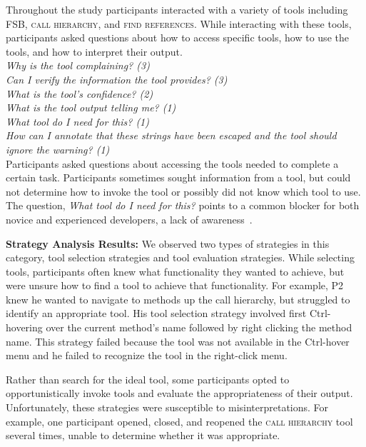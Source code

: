 \documentclass[10pt,journal,compsoc]{IEEEtran}
\begin{document}
\label{uit}

Throughout the study participants interacted with a variety of tools including FSB, \textsc{call hierarchy}, and \textsc{find references}. 
While interacting with these tools, participants asked questions about how to access specific tools, how to use the tools, and how to interpret their output. 
\\

\noindent\emph{Why is the tool complaining? (3)} \\
\emph{Can I verify the information the tool provides? (3)} \\
\emph{What is the tool's confidence? (2)} \\
\emph{What is the tool output telling me? (1)} \\
\emph{What tool do I need for this? (1)} \\ 
\emph{How can I annotate that these strings have been escaped and the tool should ignore the warning? (1)}
\\

Participants asked questions about accessing the tools needed to complete a certain task.
Participants sometimes sought information from a tool, but could not determine how to invoke the tool or possibly did not know which tool to use. 
The question, \emph{What tool do I need for this?} points to a common blocker for both novice and experienced developers, a lack of awareness~\cite{murphy-Hill2012fluency}.


\textbf{Strategy Analysis Results:}
We observed two types of strategies in this category, tool selection strategies and tool evaluation strategies. 
While selecting tools, participants often knew what functionality they wanted to achieve, but were unsure how to find a tool to achieve that functionality. For example, P2 knew he wanted to navigate to methods up the call hierarchy, but struggled to identify an appropriate tool. 
His tool selection strategy involved first Ctrl-hovering over the current method's name followed by right clicking the method name.
This strategy failed because the tool was not available in the Ctrl-hover menu and he failed to recognize the tool in the right-click menu.

Rather than search for the ideal tool, some participants opted to opportunistically invoke tools and evaluate the appropriateness of their output. Unfortunately, these strategies were susceptible to misinterpretations. For example, one participant opened, closed, and reopened the \textsc{call hierarchy} tool several times, unable to determine whether it was appropriate. 
\end{document}
